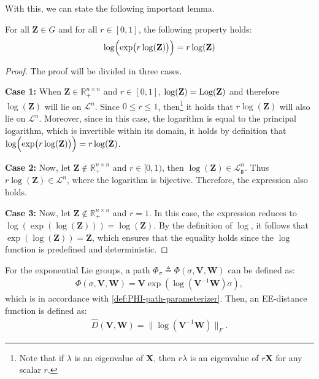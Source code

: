With this, we can state the following important lemma.
\begin{lemma}\label{lemma:log-exp-log-equals-log}
    For all $\mathbf{Z}\in G$ and for all $r \in[0, 1]$, the following property holds:
    \begin{align*}
        \log\Bigl(\exp\bigl(r\log(\mathbf{Z})\bigr)\Bigr) = r\log(\mathbf{Z})
    \end{align*}
\end{lemma}
\begin{proof}
    The proof will be divided in three cases.
    
    \textbf{Case 1:} When $\mathbf{Z} \in \mathbb{R}_+^{n\times n}$ and $r\in[0,1]$, $\log(\mathbf{Z})=\operatorname{Log}(\mathbf{Z})$ and therefore $\log(\mathbf{Z})$ will lie on $\mathcal{L}^n$. Since $0\le r\le1$, then\footnote{Note that if $\lambda$ is an eigenvalue of $\mathbf{X}$, then $r\lambda$ is an eigenvalue of $r\mathbf{X}$ for any scalar $r$.} it holds that $r \log(\mathbf{Z})$ will also lie on $\mathcal{L}^n$. Moreover, since in this case, the logarithm is equal to the principal logarithm, which is invertible within its domain, it holds by definition that $\log\Bigl(\exp\bigl(r\log(\mathbf{Z})\bigr)\Bigr) = r\log(\mathbf{Z})$.

    \textbf{Case 2:} Now, let $\mathbf{Z}\notin \mathbb{R}_+^{n\times n}$ and $r\in[0, 1)$, then $\log(\mathbf{Z}) \in \mathcal{L}^n_\mathfrak{g}$. Thus $r\log(\mathbf{Z})\in\mathcal{L}^n$, where the logarithm is bijective. Therefore, the expression also holds.

    \textbf{Case 3:} Now, let $\mathbf{Z}\notin \mathbb{R}_+^{n\times n}$ and $r=1$. In this case, the expression reduces to $\log(\exp(\log(\mathbf{Z}))) = \log(\mathbf{Z})$. By the definition of $\log$, it follows that $\exp(\log(\mathbf{Z})) = \mathbf{Z}$, which ensures that the equality holds since the $\log$ function is predefined and deterministic.
\end{proof}

For the exponential Lie groups, a path $\Phi_\sigma\triangleq\Phi(\sigma, \mathbf{V}, \mathbf{W})$ can be defined as:
\begin{align}
    \Phi(\sigma, \mathbf{V}, \mathbf{W}) = \mathbf{V}\exp{\left(\log{\left(\mathbf{V}^{-1}\mathbf{W}\right)}\sigma\right)}, \label{eq:PHI-path-parameterizer-utilized-exp-of-log}
\end{align}
which is in accordance with \cref{def:PHI-path-parameterizer}. Then, an EE-distance function is defined as:
\begin{align}
    \widehat{D}(\mathbf{V}, \mathbf{W}) = \|\log{(\mathbf{V}^{-1}\mathbf{W})}\|_F.\label{eq:distance-D-hat-utilized-log-norm}
\end{align}

